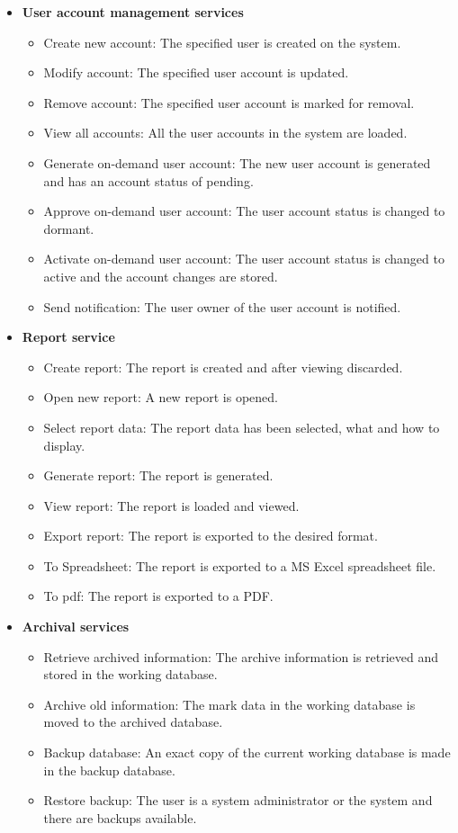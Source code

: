 \documentclass[12pt]{article}
\begin{document}
\begin{itemize}
	\item \textbf{User account management services}
		\begin{itemize}
			\item Create new account: The specified user is created on the system.
			\item Modify account: The specified user account is updated.				
			\item Remove account: The specified user account is marked for removal.	
			\item View all accounts: All the user accounts in the system are loaded.
			\item Generate on-demand user account: The new user account is generated and has an account status of pending.
			\item Approve on-demand user account: The user account status is changed to dormant.
			\item Activate on-demand user account: The user account status is changed to active and the account changes are stored.
			\item Send notification: The user owner of the user account is notified. 				
		\end{itemize}
	
	\item \textbf{Report service}
		\begin{itemize}
			\item Create report: The report is created and after viewing discarded.
			\item Open new report: A new report is opened.
			\item Select report data: The report data has been selected, what and how to display.
			\item Generate report: The report is generated.
			\item View report: The report is loaded and viewed.
			\item Export report: The report is exported to the desired format.
			\item To Spreadsheet: The report is exported to a MS Excel spreadsheet file.
			\item To pdf: The report is exported to a PDF.	
		\end{itemize}	
	
	\item \textbf{Archival services}
		\begin{itemize}
			\item Retrieve archived information: The archive information is retrieved and stored in the working database.
			\item Archive old information: The mark data in the working database is moved to the archived database.	
			\item Backup database: An exact copy of the current working database is made in the backup database.	
			\item Restore backup: The user is a system administrator or the system and there are backups available.			
		\end{itemize}
		

\end{itemize}
\end{document}
